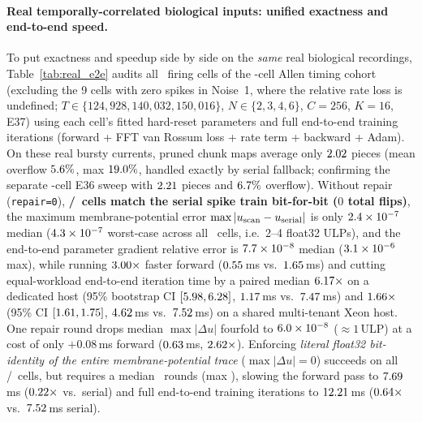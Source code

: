 \documentclass[10pt]{article}
\theoremstyle{remark}
\begin{document}
\paragraph{Real temporally-correlated biological inputs: unified exactness and end-to-end speed.}
To put exactness and speedup side by side on the \emph{same} real biological recordings, Table~\ref{tab:real_e2e} audits all \RealAuditCells\ firing cells of the \AllenSpeedCells-cell Allen timing cohort (excluding the 9 cells with zero spikes in Noise~1, where the relative rate loss is undefined; $T\in\{124{,}928, 140{,}032, 150{,}016\}$, $N\in\{2,3,4,6\}$, $C=256$, $K=16$, E37) using each cell's fitted hard-reset parameters and full end-to-end training iterations (forward + FFT van Rossum loss + rate term + backward + Adam).
On these real bursty currents, pruned chunk maps average only $2.02$ pieces (mean overflow $5.6\%$, max $19.0\%$, handled exactly by serial fallback; confirming the separate \RealCells-cell E36 sweep with $2.21$ pieces and $6.7\%$ overflow).
Without repair (\texttt{repair=0}), \textbf{\RealAuditRZeroSpkEq/\RealAuditCells\ cells match the serial spike train bit-for-bit ($0$ total flips)}, the maximum membrane-potential error $\max|u_{\rm scan}-u_{\rm serial}|$ is only $2.4\times10^{-7}$ median ($4.3\times10^{-7}$ worst-case across all \RealAuditCells\ cells, i.e.\ 2--4 float32 ULPs), and the end-to-end parameter gradient relative error is $7.7\times10^{-8}$ median ($3.1\times10^{-6}$ max), while running $3.00\times$ faster forward ($0.55$\,ms vs.\ $1.65$\,ms) and cutting equal-workload end-to-end iteration time by a paired median $6.17\times$ on a dedicated host (95\% bootstrap CI $[5.98,6.28]$, $1.17$\,ms vs.\ $7.47$\,ms) and $1.66\times$ (95\% CI $[1.61,1.75]$, $4.62$\,ms vs.\ $7.52$\,ms) on a shared multi-tenant Xeon host.
One repair round drops median $\max|\Delta u|$ fourfold to $6.0\times10^{-8}$ ($\approx 1$\,ULP) at a cost of only $+0.08$\,ms forward ($0.63$\,ms, $2.62\times$).
Enforcing \emph{literal float32 bit-identity of the entire membrane-potential trace} ($\max|\Delta u|=0$) succeeds on all \RealAuditExactUEq/\RealAuditCells\ cells, but requires a median \RealAuditExactItersMed\ rounds (max \RealAuditExactItersMax), slowing the forward pass to $7.69$\,ms ($0.22\times$ vs.\ serial) and full end-to-end training iterations to $12.21$\,ms ($0.64\times$ vs.\ $7.52$\,ms serial).
\end{document}
